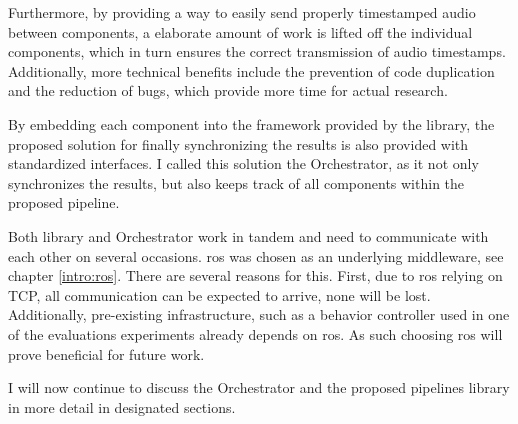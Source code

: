 Furthermore, by providing a way to easily send properly timestamped audio between components, a elaborate amount of work is lifted off the individual components, which in turn ensures the correct transmission of audio timestamps.
Additionally, more technical benefits include the prevention of code duplication and the reduction of bugs, which provide more time for actual research.

By embedding each component into the framework provided by the library, the proposed solution for finally synchronizing the results is also provided with standardized interfaces.
I called this solution the Orchestrator, as it not only synchronizes the results, but also keeps track of all components within the proposed pipeline.

Both library and Orchestrator work in tandem and need to communicate with each other on several occasions.
\gls{ros} was chosen as an underlying middleware, see chapter \ref{intro:ros}.
There are several reasons for this.
First, due to \gls{ros} relying on TCP, all communication can be expected to arrive, none will be lost.
Additionally, pre-existing infrastructure, such as a behavior controller used in one of the evaluations experiments already depends on \gls{ros}.
As such choosing \gls{ros} will prove beneficial for future work.

I will now continue to discuss the Orchestrator and the proposed pipelines library in more detail in designated sections.



\newpage

\newpage
